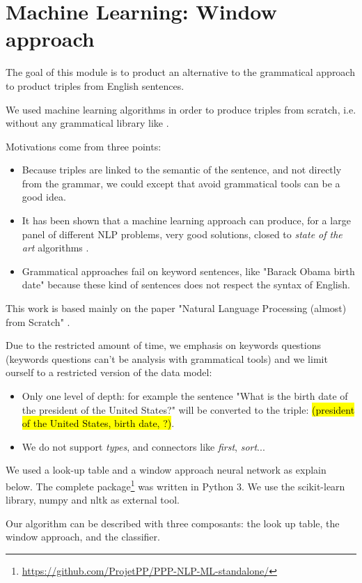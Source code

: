 \section{Machine Learning: Window approach}

The goal of this module is to product an alternative to the grammatical approach to product triples from English sentences.

We used machine learning algorithms in order to produce triples from scratch, i.e. without any grammatical library like \Stanford.


Motivations come from three points:
\begin{itemize}
\item Because triples are linked to the semantic of the sentence, and not directly from the grammar, we could except that avoid grammatical tools can be a good idea.
\item It has been shown that a machine learning approach can produce, for a large panel of different NLP problems, very good solutions, closed to \textit{state of the art} algorithms \cite{collobert}.
\item Grammatical approaches fail on keyword sentences, like "Barack Obama birth date" because these kind of sentences does not respect the syntax of English.
\end{itemize}

This work is based mainly on the paper "Natural Language Processing (almost) from Scratch" \cite{collobert}.

Due to the restricted amount of time, we emphasis on keywords questions (keywords questions can't be analysis with grammatical tools) and we limit ourself to a restricted version of the data model:
\begin{itemize}
\item Only one level of depth: for example the sentence "What is the birth date of the president of the United States?" will be converted to the triple: \hl{(president of the United States, birth date, ?)}. 
\item We do not support \textit{types}, and connectors like \textit{first}, \textit{sort}...
\end{itemize}
We used a look-up table and a window approach neural network as explain below. The complete package\footnote{\url{https://github.com/ProjetPP/PPP-NLP-ML-standalone/}} was written in Python 3. We use the scikit-learn library, numpy and nltk as external tool.

Our algorithm can be described with three composants: the look up table, the window approach, and the classifier.

